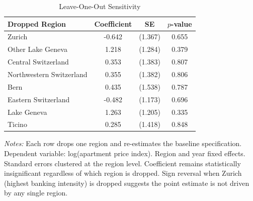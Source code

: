 \begin{table}[t]
\centering
\caption{Leave-One-Out Sensitivity}
\label{tab:loo}
\begin{threeparttable}
\begin{tabular}{lccc}
\toprule
Dropped Region & Coefficient & SE & $p$-value \\
\midrule
Zurich & -0.642 & (1.367) & 0.655 \\
Other Lake Geneva & 1.218 & (1.284) & 0.379 \\
Central Switzerland & 0.353 & (1.383) & 0.807 \\
Northwestern Switzerland & 0.355 & (1.382) & 0.806 \\
Bern & 0.435 & (1.538) & 0.787 \\
Eastern Switzerland & -0.482 & (1.173) & 0.696 \\
Lake Geneva & 1.263 & (1.205) & 0.335 \\
Ticino & 0.285 & (1.418) & 0.848 \\
\bottomrule
\end{tabular}
\begin{tablenotes}[flushleft]\footnotesize
\item \textit{Notes:} Each row drops one region and re-estimates the baseline specification. Dependent variable: log(apartment price index). Region and year fixed effects. Standard errors clustered at the region level. Coefficient remains statistically insignificant regardless of which region is dropped. Sign reversal when Zurich (highest banking intensity) is dropped suggests the point estimate is not driven by any single region.
\end{tablenotes}
\end{threeparttable}
\end{table}
